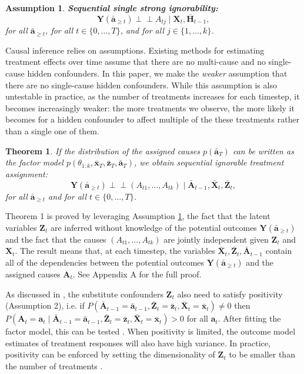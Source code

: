\documentclass{article}
\newtheorem{theorem}{Theorem}
\newtheorem{assumption}{Assumption}
\newcommand{\vc}[1]{\mathbf{#1}}
\newcommand{\ci}{\perp\!\!\!\perp}
\newcommand{\hist}[1]{\bar{\vc{#1}}}
\begin{document}
	\begin{assumption}
	\textbf{Sequential single strong ignorability:}\label{eq:single_strong_ignorability}
	\begin{equation}
	    \vc{Y}(\hist{a}_{\geq t})  \ci A_{tj} \mid \vc{X}_{t}, \bar{\vc{H}}_{t-1},
	\end{equation}
	for all $\hist{a}_{\geq t}$, for all $t\in \{0, \dots, T\}$, and for all $j \in \{1, \dots, k\}$.
	\end{assumption}
	
	Causal inference relies on assumptions. Existing methods for estimating treatment effects over time assume that there are no multi-cause and no single-cause hidden confounders. In this paper, we make the \textit{weaker} assumption that there are no single-cause hidden confounders. While this assumption is also untestable in practice, as the number of treatments increases for each timestep, it becomes increasingly weaker: the more treatments we observe, the more likely it becomes for a hidden confounder to affect multiple of the these treatments rather than a single one of them.
	
	\begin{theorem} \label{th:sequential_strong_ignorability}
	If the distribution of the assigned causes $p(\hist{a}_T)$ can be written as the factor model $p(\theta_{1:k}, \hist{x}_T, \hist{z}_T,  \hist{a}_T)$, we obtain \textit{sequential ignorable treatment assignment}:
	\begin{equation}
	\vc{Y}(\bar{\vc{a}}_{\geq t})  \ci  (A_{t1}, \dots, A_{tk}) \mid \hist{A}_{t-1},  \hist{X}_{t}, \hist{Z}_{t},
	\end{equation}
	for all $\hist{a}_{\geq t}$ and for all $t\in \{0, \dots, T\}$. 
	\end{theorem}
	
	Theorem 1 is proved by leveraging Assumption \ref{eq:single_strong_ignorability}, the fact that the latent variables $\vc{Z}_t$ are inferred without knowledge of the potential outcomes $\vc{Y}(\hist{a}_{\geq t})$ and the fact that the causes $(A_{t1}, \dots, A_{tk})$ are jointly independent given $\vc{Z}_t$ and $\vc{X}_t$. The result means that, at each timestep, the variables $\hist{X}_{t}, \hist{Z}_{t}, \hist{A}_{t-1}$ contain all of the dependencies between the potential outcomes $\vc{Y}(\hist{a}_{\geq t})$ and the assigned causes $\vc{A}_{t}$.  See Appendix A for the full proof.
	
	As discussed in \citet{wang2018blessings}, the substitute confounders $\vc{Z}_t$ also need to satisfy positivity (Assumption 2), i.e. if $P(\hist{A}_{t-1} = \hist{a}_{t-1}, \hist{Z}_t = \hist{z}_t, \hist{X}_t = \hist{x}_t) \neq 0$ then $P(\vc{A}_t = \vc{a}_t \mid \hist{A}_{t-1} = \hist{a}_{t-1}, \hist{Z}_t = \hist{z}_t, \hist{X}_t = \hist{x}_t) > 0$ for all $\vc{a}_t$. After fitting the factor model, this can be tested \citep{robins2008estimation}.  When positivity is limited, the outcome model estimates of treatment responses will also have high variance. In practice, positivity can be enforced by setting the dimensionality of $\vc{Z}_t$ to be smaller than the number of treatments \citep{wang2018blessings}.
	
\end{document}
